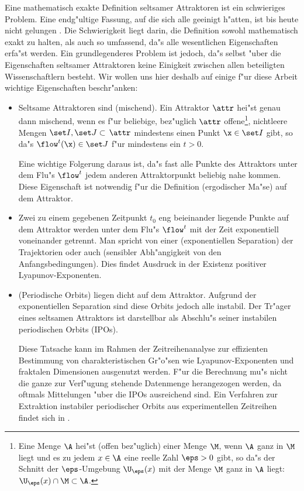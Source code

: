 Eine mathematisch exakte Definition seltsamer Attraktoren ist ein schwieriges
Problem. Eine endg"ultige Fassung, auf die sich alle geeinigt h"atten, ist bis heute nicht
gelungen \cite{Pawelzik91}. Die Schwierigkeit liegt darin, die Definition sowohl
mathematisch exakt zu halten, als auch so umfassend, da"s alle wesentlichen Eigenschaften
erfa"st werden. Ein grundlegenderes Problem ist jedoch, da"s selbst "uber die
Eigenschaften seltsamer Attraktoren keine Einigkeit zwischen allen beteiligten Wissenschaftlern
besteht. Wir wollen uns hier deshalb auf einige f"ur diese 
Arbeit wichtige Eigenschaften beschr"anken:
\begin{itemize}
\item Seltsame Attraktoren sind \begriff(mischend).  Ein Attraktor $\attr$ hei"st genau
  dann mischend, wenn es f"ur beliebige, bez"uglich $\attr$ offene\footnote{Eine Menge
    $\A$ hei"st \begriff(offen bez"uglich) einer Menge $\M$, wenn $\A$ ganz in $\M$ liegt
    und es zu jedem $x\in\A$ eine reelle Zahl $\eps>0$ gibt, so da"s der Schnitt der
    $\eps$-Umgebung $\U_\eps(x)$ mit der Menge $\M$ ganz in $\A$ liegt: $\U_\eps(x) \cap
    \M \subset \A$.  }, nichtleere Mengen $\set I,\set J\subset\,\attr$ mindestens einen
  Punkt $\x\in\set I$ gibt, so da"s $\flow^t(\x)\in\set J$ f"ur mindestens ein $t>0$.


Eine wichtige Folgerung daraus ist, da"s fast alle Punkte
des Attraktors unter dem Flu"s $\flow^t$ jedem anderen Attraktorpunkt beliebig nahe
kommen. Diese Eigenschaft ist notwendig f"ur die Definition \begriff(ergodischer Ma"se)
auf dem Attraktor. 

\item Zwei zu einem gegebenen Zeitpunkt $t_0$ eng beieinander liegende Punkte auf dem Attraktor
werden unter dem Flu"s $\flow^t$ mit der Zeit exponentiell voneinander getrennt. Man spricht von einer 
\begriff(exponentiellen Separation) der Trajektorien oder auch \begriff(sensibler
Abh"angigkeit von den Anfangsbedingungen). Dies findet Ausdruck in der Existenz positiver
Lyapunov-Exponenten.

\item \begriff(Periodische Orbits) liegen dicht auf dem Attraktor. Aufgrund der
  exponentiellen Separation sind diese Orbits jedoch alle instabil. Der Tr"ager eines
  seltsamen Attraktors ist darstellbar als Abschlu"s seiner instabilen periodischen Orbits
  (IPOs).
  
  Diese Tatsache kann im Rahmen der Zeitreihenanalyse zur effizienten Bestimmung von
  charakteristischen Gr"o"sen wie Lyapunov-Exponenten und fraktalen Dimensionen ausgenutzt
  werden. F"ur die Berechnung mu"s nicht die ganze zur Verf"ugung stehende Datenmenge
  herangezogen werden, da oftmals Mittelungen "uber die IPOs ausreichend sind.  Ein
  Verfahren zur Extraktion instabiler periodischer Orbits aus experimentellen Zeitreihen
  findet sich in \cite{Pawelzik91,Pawelzik91a}.
\end{itemize}
